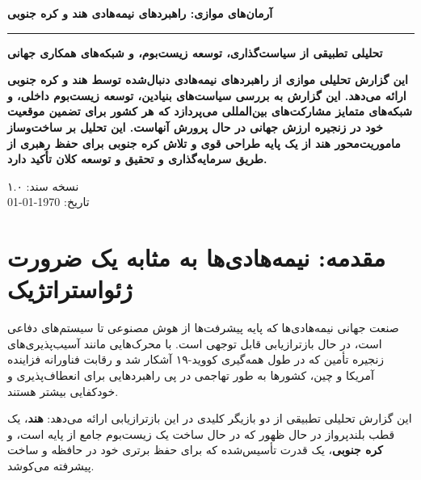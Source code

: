 \documentclass[10pt]{report}
\newcommand{\indiatext}[1]{\textcolor{IndiaBlue}{\textbf{#1}}}
\newcommand{\koreatext}[1]{\textcolor{KoreaRed}{\textbf{#1}}}
\begin{document}
\thispagestyle{empty}
\begin{center}
\vspace*{2cm}

{\Huge\bfseries\color{PrimaryColor} آرمان‌های موازی: راهبردهای نیمه‌هادی هند و کره جنوبی}

\vspace{0.6cm}
{\color{gray}\rule{0.7\textwidth}{0.75pt}}
\vspace{0.6cm}

{\Large\bfseries تحلیلی تطبیقی از سیاست‌گذاری، توسعه زیست‌بوم، و شبکه‌های همکاری جهانی}

\vspace{1.5cm}

\begin{researchbox}
\centering
\textbf{این گزارش تحلیلی موازی از راهبردهای نیمه‌هادی دنبال‌شده توسط هند و کره جنوبی ارائه می‌دهد. این گزارش به بررسی سیاست‌های بنیادین، توسعه زیست‌بوم داخلی، و شبکه‌های متمایز مشارکت‌های بین‌المللی می‌پردازد که هر کشور برای تضمین موقعیت خود در زنجیره ارزش جهانی در حال پرورش آنهاست. این تحلیل بر ساخت‌وساز ماموریت‌محور هند از یک پایه طراحی قوی و تلاش کره جنوبی برای حفظ رهبری از طریق سرمایه‌گذاری و تحقیق و توسعه کلان تأکید دارد.}
\end{researchbox}

\vfill
{\small\color{gray} نسخه سند: ۱.۰ \\ تاریخ: \today}
\end{center}

\clearpage
\tableofcontents

\clearpage
\chapter{مقدمه: نیمه‌هادی‌ها به مثابه یک ضرورت ژئواستراتژیک}

\begin{keyconceptbox}
صنعت جهانی نیمه‌هادی‌ها که پایه پیشرفت‌ها از هوش مصنوعی تا سیستم‌های دفاعی است، در حال بازترازیابی قابل توجهی است. با محرک‌هایی مانند آسیب‌پذیری‌های زنجیره تأمین که در طول همه‌گیری کووید-۱۹ آشکار شد و رقابت فناورانه فزاینده آمریکا و چین، کشورها به طور تهاجمی در پی راهبردهایی برای انعطاف‌پذیری و خودکفایی بیشتر هستند.
\end{keyconceptbox}

این گزارش تحلیلی تطبیقی از دو بازیگر کلیدی در این بازترازیابی ارائه می‌دهد: \indiatext{هند}، یک قطب بلندپرواز در حال ظهور که در حال ساخت یک زیست‌بوم جامع از پایه است، و \koreatext{کره جنوبی}، یک قدرت تأسیس‌شده که برای حفظ برتری خود در حافظه و ساخت پیشرفته می‌کوشد.
\end{document}
